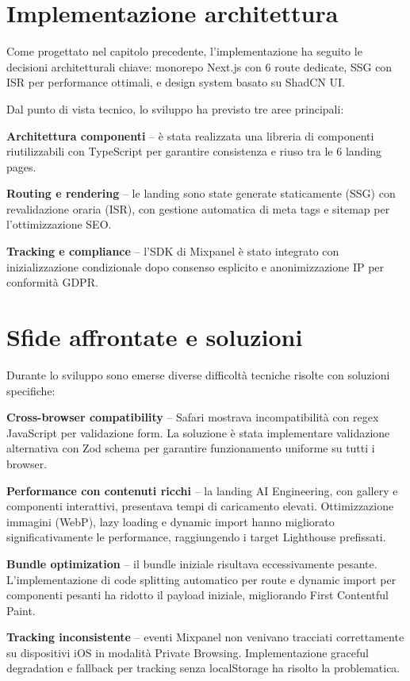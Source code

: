 \section{Implementazione architettura}
Come progettato nel capitolo precedente, l'implementazione ha seguito le decisioni 
architetturali chiave: monorepo Next.js con 6 route dedicate, SSG con ISR per 
performance ottimali, e design system basato su ShadCN UI.

Dal punto di vista tecnico, lo sviluppo ha previsto tre aree principali:

\textbf{Architettura componenti} – è stata realizzata una libreria di componenti 
riutilizzabili con TypeScript per garantire consistenza e riuso tra le 6 landing pages.

\textbf{Routing e rendering} – le landing sono state generate staticamente
(SSG) con revalidazione oraria (ISR), con gestione automatica di meta tags e
sitemap per l'ottimizzazione SEO.  

\textbf{Tracking e compliance} – l'SDK di Mixpanel è stato integrato con 
inizializzazione condizionale dopo consenso esplicito e anonimizzazione IP 
per conformità GDPR.

\section{Sfide affrontate e soluzioni}
Durante lo sviluppo sono emerse diverse difficoltà tecniche risolte con 
soluzioni specifiche:

\textbf{Cross-browser compatibility} – Safari mostrava incompatibilità con 
regex JavaScript per validazione form. La soluzione è stata implementare 
validazione alternativa con Zod schema per garantire funzionamento uniforme 
su tutti i browser.

\textbf{Performance con contenuti ricchi} – la landing AI Engineering, con
gallery e componenti interattivi, presentava tempi di caricamento elevati. 
Ottimizzazione immagini (WebP), lazy loading e dynamic import hanno migliorato 
significativamente le performance, raggiungendo i target Lighthouse prefissati.  

\textbf{Bundle optimization} – il bundle iniziale risultava eccessivamente 
pesante. L'implementazione di code splitting automatico per route e dynamic 
import per componenti pesanti ha ridotto il payload iniziale, migliorando 
First Contentful Paint.

\textbf{Tracking inconsistente} – eventi Mixpanel non venivano tracciati 
correttamente su dispositivi iOS in modalità Private Browsing. Implementazione 
graceful degradation e fallback per tracking senza localStorage ha risolto 
la problematica.

